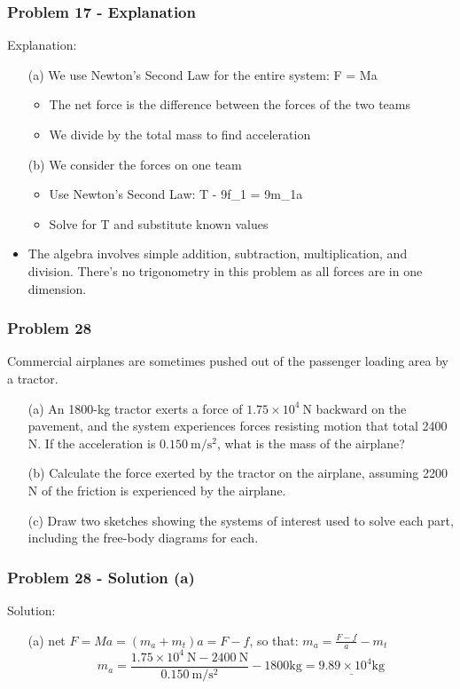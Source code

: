 \documentclass{beamer}
\begin{document}
\begin{frame}
\frametitle{Problem 17 - Explanation}
Explanation:
\begin{itemize}
    \item[(a)] We use Newton's Second Law for the entire system: F = Ma
    \begin{itemize}
        \item The net force is the difference between the forces of the two teams
        \item We divide by the total mass to find acceleration
    \end{itemize}
    \item[(b)] We consider the forces on one team
    \begin{itemize}
        \item Use Newton's Second Law: T - 9f_1 = 9m_1a
        \item Solve for T and substitute known values
    \end{itemize}
    \item The algebra involves simple addition, subtraction, multiplication, and division. There's no trigonometry in this problem as all forces are in one dimension.
\end{itemize}
\end{frame}

\begin{frame}
\frametitle{Problem 28}
Commercial airplanes are sometimes pushed out of the passenger loading area by a tractor.
\begin{itemize}
    \item[(a)] An 1800-kg tractor exerts a force of $1.75 \times 10^{4} \mathrm{~N}$ backward on the pavement, and the system experiences forces resisting motion that total 2400 N. If the acceleration is $0.150 \mathrm{~m} / \mathrm{s}^{2}$, what is the mass of the airplane?
    \item[(b)] Calculate the force exerted by the tractor on the airplane, assuming 2200 N of the friction is experienced by the airplane.
    \item[(c)] Draw two sketches showing the systems of interest used to solve each part, including the free-body diagrams for each.
\end{itemize}
\end{frame}

\begin{frame}
\frametitle{Problem 28 - Solution (a)}
Solution:
\begin{itemize}
    \item[(a)] net $F = Ma = (m_a + m_t)a = F - f$, so that: $m_a = \frac{F - f}{a} - m_t$
    \begin{equation*}
    m_a = \frac{1.75 \times 10^{4} \mathrm{~N} - 2400 \mathrm{~N}}{0.150 \mathrm{~m} / \mathrm{s}^{2}} - 1800 \mathrm{kg} = \underline{9.89 \times 10^{4} \mathrm{kg}}
    \end{equation*}
\end{itemize}
\end{frame}
\end{document}
